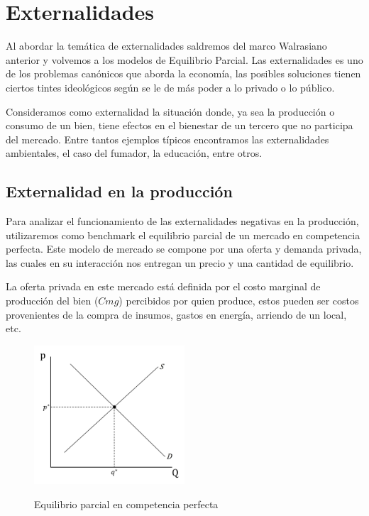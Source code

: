\newpage
\section{Externalidades}

Al abordar la temática de externalidades saldremos del marco Walrasiano anterior y volvemos a los modelos de Equilibrio Parcial. Las externalidades es uno de los problemas canónicos que aborda la economía, las posibles soluciones tienen ciertos tintes ideológicos según se le de más poder a lo privado o lo público.

Consideramos como externalidad la situación donde, ya sea la producción o consumo de un bien, tiene efectos en el bienestar de un tercero que no participa del mercado. Entre tantos ejemplos típicos encontramos las externalidades ambientales, el caso del fumador, la educación, entre otros.

\subsection{Externalidad en la producción}

Para analizar el funcionamiento de las externalidades negativas en la producción, utilizaremos como benchmark el equilibrio parcial de un mercado en competencia perfecta. Este modelo de mercado se compone por una oferta y demanda privada, las cuales en su interacción nos entregan un precio y una cantidad de equilibrio.

La oferta privada en este mercado está definida por el costo marginal de producción del bien ($Cmg$) percibidos por quien produce, estos pueden ser costos provenientes de la compra de insumos, gastos en energía, arriendo de un local, etc. 

\begin{figure}[htbp]
    \centering
    \caption{Equilibrio parcial en competencia perfecta}
    \includegraphics[width=0.5\textwidth]{Figuras/Eq Parcial EXT.jpg}
    \label{fig:Eq parcial}
\end{figure}

